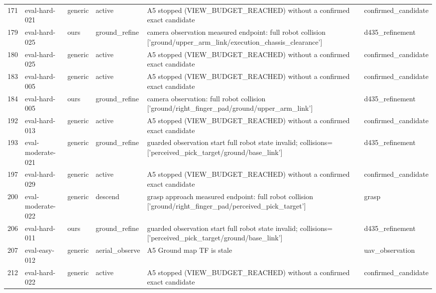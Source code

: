\begin{tabular}{llllll}
171 & eval-hard-021 & generic & active & A5 stopped (VIEW\_BUDGET\_REACHED) without a confirmed exact candidate & confirmed\_candidate \\
179 & eval-hard-025 & ours & ground\_refine & camera observation measured endpoint: full robot collision ['ground/upper\_arm\_link/execution\_chassis\_clearance'] & d435\_refinement \\
180 & eval-hard-025 & generic & active & A5 stopped (VIEW\_BUDGET\_REACHED) without a confirmed exact candidate & confirmed\_candidate \\
183 & eval-hard-005 & generic & active & A5 stopped (VIEW\_BUDGET\_REACHED) without a confirmed exact candidate & confirmed\_candidate \\
184 & eval-hard-005 & ours & ground\_refine & camera observation: full robot collision ['ground/right\_finger\_pad/ground/upper\_arm\_link'] & d435\_refinement \\
192 & eval-hard-013 & generic & active & A5 stopped (VIEW\_BUDGET\_REACHED) without a confirmed exact candidate & confirmed\_candidate \\
193 & eval-moderate-021 & generic & ground\_refine & guarded observation start full robot state invalid; collisions=['perceived\_pick\_target/ground/base\_link'] & d435\_refinement \\
197 & eval-hard-029 & generic & active & A5 stopped (VIEW\_BUDGET\_REACHED) without a confirmed exact candidate & confirmed\_candidate \\
200 & eval-moderate-022 & generic & descend & grasp approach measured endpoint: full robot collision ['ground/right\_finger\_pad/perceived\_pick\_target'] & grasp \\
206 & eval-hard-011 & ours & ground\_refine & guarded observation start full robot state invalid; collisions=['perceived\_pick\_target/ground/base\_link'] & d435\_refinement \\
207 & eval-easy-012 & generic & aerial\_observe & A5 Ground map TF is stale & uav\_observation \\
212 & eval-hard-022 & generic & active & A5 stopped (VIEW\_BUDGET\_REACHED) without a confirmed exact candidate & confirmed\_candidate \\
\hline
\end{tabular}
